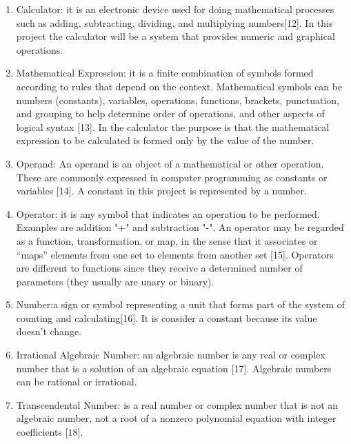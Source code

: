 \documentclass{report}
\begin{document}
\begin{enumerate}
\item Calculator: it is an electronic device used for doing mathematical processes such as adding, subtracting, dividing, and multiplying numbers[12]. In this project the calculator will be a system that provides numeric and graphical operations. \newline

\item Mathematical Expression: it is a finite combination of symbols formed according to rules that depend on the context. Mathematical symbols can be numbers (constants), variables, operations, functions, brackets, punctuation, and grouping to help determine order of operations, and other aspects of logical syntax [13]. In the calculator the purpose is that the mathematical expression to be calculated is formed only by the value of the number. \newline

\item Operand: An operand is an object of a mathematical or other operation. These are commonly expressed in computer programming as constants or variables [14]. A constant in this project is represented by a number. \newline

\item Operator: it is any symbol that indicates an operation to be performed. Examples are addition "+" and subtraction "-". An operator may be regarded as a function, transformation, or map, in the sense that it associates or “maps” elements from one set to elements from another set [15]. Operators are different to functions since they receive a determined number of parameters (they usually are unary or binary). \newline

\item Number:a sign or symbol representing a unit that forms part of the system of counting and calculating[16]. It is consider a constant because its value doesn't change. \newline

\item Irrational Algebraic Number: an algebraic number is any real or complex number that is a solution of an algebraic equation [17]. Algebraic numbers can be rational or irrational. \newline

\item Transcendental Number: is a real number or complex number that is not an algebraic number, not a root of a nonzero polynomial equation with integer coefficients [18]. \newline


\end{enumerate}
\end{document}
